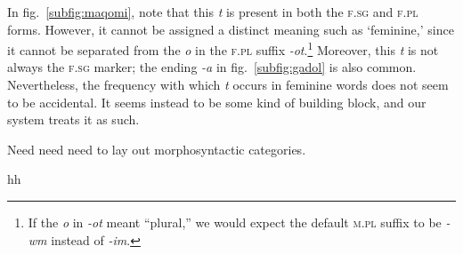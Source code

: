 In fig.~\ref{subfig:maqomi}, note that this \textit{t} is present in
both the \textsc{f.sg} and \textsc{f.pl} forms.  However, it cannot
be assigned a distinct meaning such as `feminine,' %
since it cannot be separated from the \textit{o} in the \textsc{f.pl}
suffix \textit{-ot}.\footnote{If the \textit{o} in \textit{-ot} meant
``plural,'' we would expect the default \textsc{m.pl} suffix to be
\textit{-wm} instead of \textit{-im}.}  Moreover, this \textit{t} is
not always the \textsc{f.sg} marker; the ending \textit{-a} in 
fig.~\ref{subfig:gadol} is also common. Nevertheless, the frequency
with which \textit{t} occurs in feminine words does not seem to be
accidental. It seems instead to be some kind of building block, and
our system treats it as such.

Need need need to lay out morphosyntactic categories.
%
%
%
%
%
\begin{exe}
\ex hh
\ex {}  
\ex {}  
\end{exe}

